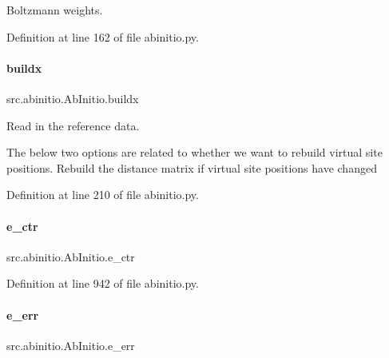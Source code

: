 Boltzmann weights. 



Definition at line 162 of file abinitio.\+py.

\mbox{\label{classsrc_1_1abinitio_1_1AbInitio_a01471cb04776812a1ac6fbdaef5c4152}} 
\paragraph{\texorpdfstring{buildx}{buildx}}
{\footnotesize\ttfamily src.\+abinitio.\+Ab\+Initio.\+buildx}



Read in the reference data. 

The below two options are related to whether we want to rebuild virtual site positions. Rebuild the distance matrix if virtual site positions have changed 

Definition at line 210 of file abinitio.\+py.

\mbox{\label{classsrc_1_1abinitio_1_1AbInitio_a6bd370861768a87aa5f6e486cb208a43}} 
\paragraph{\texorpdfstring{e\+\_\+ctr}{e\_ctr}}
{\footnotesize\ttfamily src.\+abinitio.\+Ab\+Initio.\+e\+\_\+ctr}



Definition at line 942 of file abinitio.\+py.

\mbox{\label{classsrc_1_1abinitio_1_1AbInitio_a184c5a163d4e359f3f2b8d1788d11c16}} 
\paragraph{\texorpdfstring{e\+\_\+err}{e\_err}}
{\footnotesize\ttfamily src.\+abinitio.\+Ab\+Initio.\+e\+\_\+err}



